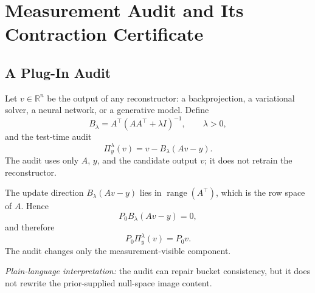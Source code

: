 \documentclass[journal]{IEEEtran}
\newcommand{\R}{\mathbb{R}}
\newcommand{\range}{\operatorname{range}}
\newcommand{\PZ}{P_{0}}
\newcommand{\Audit}{\Pi_y^\lambda}
\newcommand{\Blambda}{B_\lambda}
\begin{document}
\section{Measurement Audit and Its Contraction Certificate}
\label{sec:audit}

\subsection{A Plug-In Audit}

Let $v\in\R^n$ be the output of any reconstructor: a backprojection, a variational solver, a neural network, or a generative model.  Define
\begin{equation}
    \Blambda = A^\top(AA^\top+\lambda I)^{-1},\qquad \lambda>0,
    \label{eq:blambda}
\end{equation}
and the test-time audit
\begin{equation}
    \Audit(v)=v-\Blambda(Av-y).
    \label{eq:audit}
\end{equation}
The audit uses only $A$, $y$, and the candidate output $v$; it does not retrain the reconstructor.

The update direction $\Blambda(Av-y)$ lies in $\range(A^\top)$, which is the row space of $A$.  Hence
\begin{equation}
    \PZ\Blambda(Av-y)=0,
\end{equation}
and therefore
\begin{equation}
    \PZ\Audit(v)=\PZ v.
    \label{eq:audit-null-unchanged}
\end{equation}
The audit changes only the measurement-visible component.

\textit{Plain-language interpretation:} the audit can repair bucket consistency, but it does not rewrite the prior-supplied null-space image content.
\end{document}
